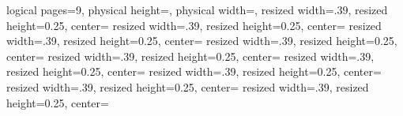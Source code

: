 \pgfpagesphysicalpageoptions%
{
logical pages=9,
physical height=\paperwidth,
physical width=\paperheight,
}
{
resized width=.39\pgfphysicalwidth,
resized height=0.25\pgfphysicalheight,
center=\pgfpoint{0.23\pgfphysicalwidth}{0.85\pgfphysicalheight}
}
{
resized width=.39\pgfphysicalwidth,
resized height=0.25\pgfphysicalheight,
center=\pgfpoint{.64\pgfphysicalwidth}{.85\pgfphysicalheight}
}
{
resized width=.39\pgfphysicalwidth,
resized height=0.25\pgfphysicalheight,
center=\pgfpoint{1.05\pgfphysicalwidth}{.85\pgfphysicalheight}
}
{
resized width=.39\pgfphysicalwidth,
resized height=0.25\pgfphysicalheight,
center=\pgfpoint{.23\pgfphysicalwidth}{.615\pgfphysicalheight}
}
{
resized width=.39\pgfphysicalwidth,
resized height=0.25\pgfphysicalheight,
center=\pgfpoint{.64\pgfphysicalwidth}{.615\pgfphysicalheight}
}
{
resized width=.39\pgfphysicalwidth,
resized height=0.25\pgfphysicalheight,
center=\pgfpoint{1.05\pgfphysicalwidth}{.615\pgfphysicalheight}
}
{
resized width=.39\pgfphysicalwidth,
resized height=0.25\pgfphysicalheight,
center=\pgfpoint{.23\pgfphysicalwidth}{.38\pgfphysicalheight}
}
{
resized width=.39\pgfphysicalwidth,
resized height=0.25\pgfphysicalheight,
center=\pgfpoint{.64\pgfphysicalwidth}{.38\pgfphysicalheight}
}
{
resized width=.39\pgfphysicalwidth,
resized height=0.25\pgfphysicalheight,
center=\pgfpoint{1.05\pgfphysicalwidth}{.38\pgfphysicalheight}
}

